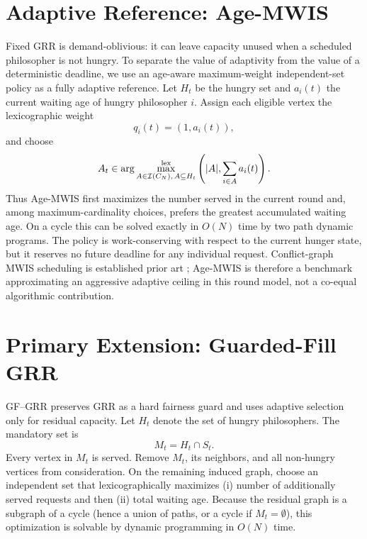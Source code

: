 \documentclass[10pt,journal]{IEEEtran}
\newcommand{\GF}{\textsc{GF--GRR}\xspace}
\begin{document}
\section{Adaptive Reference: Age-MWIS}
Fixed GRR is demand-oblivious: it can leave capacity unused when a scheduled philosopher is not hungry. To separate the value of adaptivity from the value of a deterministic deadline, we use an age-aware maximum-weight independent-set policy as a fully adaptive reference. Let $H_t$ be the hungry set and $a_i(t)$ the current waiting age of hungry philosopher $i$. Assign each eligible vertex the lexicographic weight
\begin{equation}
q_i(t)=(1,a_i(t)),
\end{equation}
and choose
\begin{equation}
A_t\in\arg\max_{A\in\mathcal{I}(C_N),\,A\subseteq H_t}^{\rm lex}
\left(|A|,\sum_{i\in A}a_i(t)\right).
\end{equation}
Thus Age-MWIS first maximizes the number served in the current round and, among maximum-cardinality choices, prefers the greatest accumulated waiting age. On a cycle this can be solved exactly in $O(N)$ time by two path dynamic programs. The policy is work-conserving with respect to the current hunger state, but it reserves no future deadline for any individual request. Conflict-graph MWIS scheduling is established prior art \cite{barnoy1998,paschalidis2015}; Age-MWIS is therefore a benchmark approximating an aggressive adaptive ceiling in this round model, not a co-equal algorithmic contribution.

\section{Primary Extension: Guarded-Fill GRR}
\GF preserves GRR as a hard fairness guard and uses adaptive selection only for residual capacity. Let $H_t$ denote the set of hungry philosophers. The mandatory set is
\begin{equation}
M_t=H_t\cap S_t.
\end{equation}
Every vertex in $M_t$ is served. Remove $M_t$, its neighbors, and all non-hungry vertices from consideration. On the remaining induced graph, choose an independent set that lexicographically maximizes (i) number of additionally served requests and then (ii) total waiting age. Because the residual graph is a subgraph of a cycle (hence a union of paths, or a cycle if $M_t=\emptyset$), this optimization is solvable by dynamic programming in $O(N)$ time.
\end{document}
